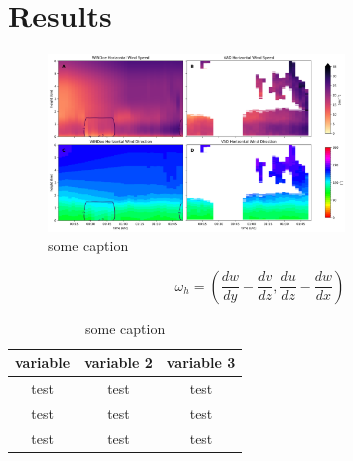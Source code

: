 \chapter{Results}
\label{chap:results}



\begin{figure}[h!]
    \centering %
    \includegraphics[width=0.7\textwidth]{figures/example.png} %
    \caption{some caption} %
    \label{fig:some_fig} %
\end{figure}

\begin{equation}
    \omega_h = (\frac{dw}{dy} - \frac{dv}{dz}, \frac{du}{dz} - \frac{dw}{dx}) %
    \label{eq:some_eq} %
\end{equation}

\begin{table}[h!]
    \centering %
    \begin{tabular}{c|c|c} %
        \textbf{variable} & \textbf{variable 2} & \textbf{variable 3} \\\hline %
        test & test & test\\ %
        test & test & test\\ %
        test & test & test\\ %
    \end{tabular}
    \caption{some caption} %
    \label{tab:some_table} %
\end{table}
